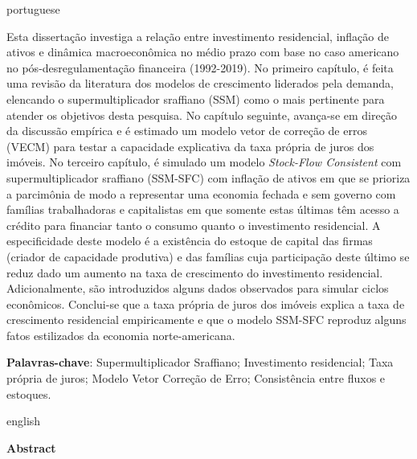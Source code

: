 \documentclass[12pt,openright,oneside,a4paper,english,sumario=tradicional]{gpsabntex}
\renewcommand{\ABNTEXchapterfont}{\rmfamily\bfseries}
\numberwithin{listing}{chapter}
\begin{document}
\begin{resumo}
\thispagestyle{empty} %
\begin{otherlanguage*}{portuguese}

Esta dissertação investiga a relação entre investimento residencial, inflação de ativos e dinâmica macroeconômica no médio prazo com base no caso americano no pós-desregulamentação financeira (1992-2019).
No primeiro capítulo, é feita uma revisão da literatura dos modelos de crescimento liderados pela demanda, elencando o supermultiplicador sraffiano (SSM) como o mais pertinente para atender os objetivos desta pesquisa.
No capítulo seguinte, avança-se em direção da discussão empírica e é estimado um modelo vetor de correção de erros (VECM) para testar a capacidade explicativa da taxa própria de juros dos imóveis.
No terceiro capítulo, é simulado um modelo \textit{Stock-Flow Consistent} com supermultiplicador sraffiano (SSM-SFC) com inflação de ativos em que se
prioriza a parcimônia de modo a representar uma economia fechada e sem governo com famílias trabalhadoras e capitalistas em que somente estas últimas têm acesso a crédito para financiar tanto o consumo quanto o investimento residencial.
A especificidade deste modelo é a existência do estoque de capital das firmas (criador de capacidade produtiva) e das famílias
cuja participação deste último se reduz dado um aumento na taxa de crescimento do investimento residencial.
Adicionalmente, são introduzidos alguns dados observados para simular ciclos econômicos.
Conclui-se que a taxa própria de juros dos imóveis explica a taxa de crescimento residencial empiricamente e que o modelo SSM-SFC reproduz alguns fatos estilizados da economia norte-americana.



\vspace{\onelineskip}

\noindent\textbf{Palavras-chave}: 
	Supermultiplicador Sraffiano; 
	Investimento residencial; 
	Taxa própria de juros; 
	Modelo Vetor Correção de Erro;
	Consistência entre fluxos e estoques.
\end{otherlanguage*}
\newpage

\begin{otherlanguage*}{english}
	\thispagestyle{empty}
	\begin{center}{\ABNTEXchapterfont\huge Abstract}\end{center}
	

\end{otherlanguage*}
\end{resumo}
\end{document}
